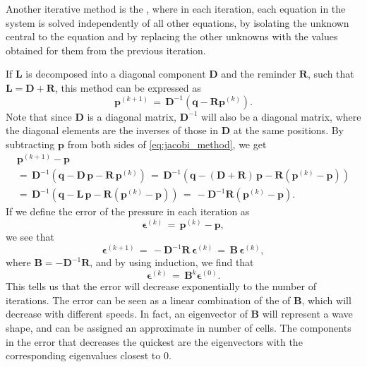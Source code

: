Another iterative method is the , where in each iteration, each equation in the system is solved independently of all other equations, by isolating the unknown central to the equation and by replacing the other unknowns with the values obtained for them from the previous iteration.

If $\mathbf{L}$ is decomposed into a diagonal component $\mathbf{D}$ and the reminder $\mathbf{R}$, such that $\mathbf{L} = \mathbf{D} + \mathbf{R}$, this method can be expressed as
%
\begin{equation} \label{eq:jacobi_method}
\mathbf{p}^{(k+1)} \,=\, \mathbf{D}^{-1}(\mathbf{q} - \mathbf{R}\mathbf{p}^{(k)}).
\end{equation}
%
Note that since $\mathbf{D}$ is a diagonal matrix, $\mathbf{D}^{-1}$ will also be a diagonal matrix, where the diagonal elements are the inverses of those in $\mathbf{D}$ at the same positions. By subtracting $\mathbf{p}$ from both sides of \eqref{eq:jacobi_method}, we get
%
\begin{equation}
\renewcommand*{\arraystretch}{1.5}
\begin{array}{c}
\mathbf{p}^{(k+1)} - \mathbf{p} \\
=\, \mathbf{D}^{-1}(\mathbf{q} - \mathbf{D}\,\mathbf{p} - \mathbf{R}\,\mathbf{p}^{(k)}) \,=\, \mathbf{D}^{-1}(\mathbf{q} - (\mathbf{D} + \mathbf{R})\,\mathbf{p} - \mathbf{R}(\mathbf{p}^{(k)} - \mathbf{p})) \\
=\, \mathbf{D}^{-1}(\mathbf{q} - \mathbf{L}\,\mathbf{p} - \mathbf{R}(\mathbf{p}^{(k)} - \mathbf{p})) \,=\, -\mathbf{D}^{-1}\mathbf{R}(\mathbf{p}^{(k)} - \mathbf{p}).
\end{array}
\end{equation}
%
If we define the error of the pressure in each iteration as
%
\begin{equation} \label{eq:pressure_error}
\mathbf{\epsilon}^{(k)} \,=\, \mathbf{p}^{(k)} - \mathbf{p},
\end{equation}
%
we see that
%
\begin{equation} \label{eq:jacobi_method_error}
\mathbf{\epsilon}^{(k+1)} \,=\, -\mathbf{D}^{-1}\mathbf{R}\,\mathbf{\epsilon}^{(k)} \,=\, \mathbf{B}\,\mathbf{\epsilon}^{(k)},
\end{equation}
%
where $\mathbf{B} = -\mathbf{D}^{-1}\mathbf{R}$, and by using induction, we find that
%
\begin{equation} \label{eq:jacobi_method_error_from_initial_error}
\mathbf{\epsilon}^{(k)} \,=\, \mathbf{B}^k\mathbf{\epsilon}^{(0)}.
\end{equation}
%
This tells us that the error will decrease exponentially to the number of iterations. The error can be seen as a linear combination of the \eigenvectors of $\mathbf{B}$, which will decrease with different speeds. In fact, an eigenvector of $\mathbf{B}$ will represent a wave shape, and can be assigned an approximate \wavelength in number of cells. The components in the error that decreases the quickest are the eigenvectors with the corresponding eigenvalues closest to 0.

